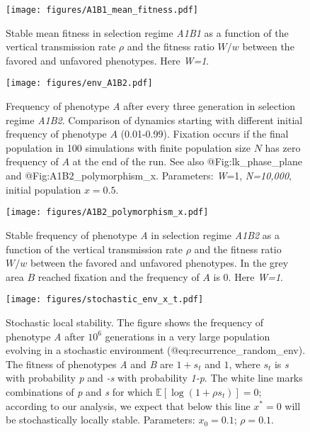 \begin{figure}
\centering
\texttt{[image: figures/A1B1\_mean\_fitness.pdf]}
\caption{Stable mean fitness in selection regime \emph{A1B1} as a
function of the vertical transmission rate \(\rho\) and the fitness
ratio \(W/w\) between the favored and unfavored phenotypes. Here 
\emph{W=1}.}\label{fig:A1B1_mean_fitness}
\end{figure}

\begin{figure}
\centering
\texttt{[image: figures/env\_A1B2.pdf]}
\caption{Frequency of phenotype \emph{A} after every three generation in
selection regime \emph{A1B2}. Comparison of dynamics starting with
different initial frequency of phenotype \(A\) (0.01-0.99). Fixation occurs if the final population in 100 simulations with finite
population size \(N\) has zero frequency of \(A\) at the end of the run. See also @Fig:lk\_phase\_plane
and @Fig:A1B2\_polymorphism\_x. Parameters: \emph{W}=1, \emph{N=10,000},
initial population \(x=0.5\).}\label{fig:env_A1B2}
\end{figure}

\begin{figure}
\centering
\texttt{[image: figures/A1B2\_polymorphism\_x.pdf]}
\caption{Stable frequency of phenotype \emph{A} in selection regime
\emph{A1B2} as a function of the vertical transmission rate \(\rho\) and
the fitness ratio \(W/w\) between the favored and unfavored phenotypes.
In the grey area \(B\) reached fixation and the frequency of \(A\) is 0.
Here \emph{W=1}.}\label{fig:A1B2_polymorphism_x}
\end{figure}

\begin{figure}
\centering
\texttt{[image: figures/stochastic\_env\_x\_t.pdf]}
\caption{Stochastic local stability. The figure shows the frequency of
phenotype \emph{A} after \(10^6\) generations in a very large population
evolving in a stochastic environment (@eq:recurrence\_random\_env). The
fitness of phenotypes \emph{A} and \emph{B} are \(1+s_t\) and \(1\),
where \(s_t\) is \emph{s} with probability \emph{p} and \emph{-s} with
probability \emph{1-p}. The white line marks combinations of \emph{p}
and \emph{s} for which \(\mathbb{E}[\log{(1+\rho s_t)}]=0\); according
to our analysis, we expect that below this line \(x^*=0\) will be
stochastically locally stable. Parameters: \(x_0=0.1\);
\(\rho=0.1\).}\label{fig:stochastic_env_x_t}
\end{figure}

